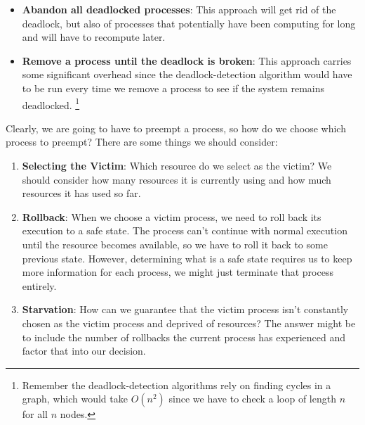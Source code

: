 \documentclass{tufte-handout}
\begin{document}
\begin{itemize}
	\item \textbf{Abandon all deadlocked processes}: This approach will get rid of the
			deadlock, but also of processes that potentially have been computing for 
			long and will have to recompute later.
	\item \textbf{Remove a process until the deadlock is broken}: This approach carries
			some significant overhead since the deadlock-detection algorithm would 
			have to be run every time we remove a process to see if the system 
			remains deadlocked.
			\footnote{Remember the deadlock-detection algorithms rely on finding cycles
				in a graph, which would take $O(n^{2})$ since we have to check a loop
				of length $n$ for all $n$ nodes.}
\end{itemize}

Clearly, we are going to have to preempt a process, so how do we choose which process
to preempt?
There are some things we should consider:
\begin{enumerate}
	\item \textbf{Selecting the Victim}: Which resource do we select as the victim?
		We should consider how many resources it is currently using and how much
		resources it has used so far.
	\item \textbf{Rollback}: When we choose a victim process, we need to roll 
			back its execution to a safe state. The process can't continue
			with normal execution until the resource becomes available, so we have 
			to roll it back to some previous state. However, determining what 
			is a safe state requires us to keep more information for each process,
			we might just terminate that process entirely.
	\item \textbf{Starvation}: How can we guarantee that the victim process isn't 
			constantly chosen as the victim process and deprived of resources? The
			answer might be to include the number of rollbacks the current process has
			experienced and factor that into our decision.
\end{enumerate}
\end{document}

